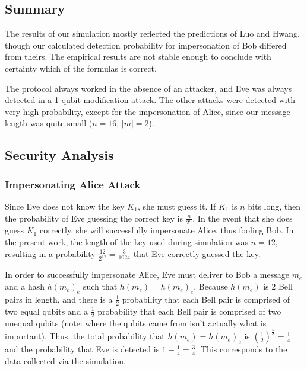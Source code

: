 \documentclass[conference]{IEEEtran}
\begin{document}
\subsection{Summary}

The results of our simulation mostly reflected the predictions of Luo and Hwang,
though our calculated detection probability for impersonation of Bob differed from theirs.
The empirical results are not stable enough to conclude with certainty which of the formulas is correct.

The protocol always worked in the absence of an attacker, and Eve was always detected
in a 1-qubit modification attack. The other attacks were detected with very high probability,
except for the impersonation of Alice, since our message length was quite small ($n=16$, $|m|=2$).

\subsection{Security Analysis}

\subsubsection{Impersonating Alice Attack}

Since Eve does not know the key $K_{1}$, she must guess it. If $K_{1}$
is $n$ bits long, then the probability of Eve guessing the correct
key is $\frac{n}{2^{n}}$. In the event that she does guess $K_{1}$
correctly, she will successfully impersonate Alice, thus fooling Bob.
In the present work, the length of the key used during simulation
was $n=12$, resulting in a probability $\frac{12}{2^{12}}=\frac{3}{1024}$
that Eve correctly guessed the key. 

In order to successfully impersonate Alice, Eve must deliver to Bob
a message $m_{e}$ and a hash $h\left(m_{e}\right)_{e}$ such that
$h\left(m_{e}\right)=h\left(m_{e}\right)_{e}$. Because $h\left(m_{e}\right)$
is $2$ Bell pairs in length, and there is a $\frac{1}{2}$ probability
that each Bell pair is comprised of two equal qubits and a $\frac{1}{2}$
probability that each Bell pair is comprised of two unequal qubits
(note: where the qubits came from isn't actually what is important).
Thus, the total probability that $h\left(m_{e}\right)=h\left(m_{e}\right)_{e}$
is $\left(\frac{1}{2}\right)^{\frac{n}{8}}=\frac{1}{4}$ and the probability
that Eve is detected is $1-\frac{1}{4}=\frac{3}{4}$. This corresponds
to the data collected via the simulation.
\end{document}
